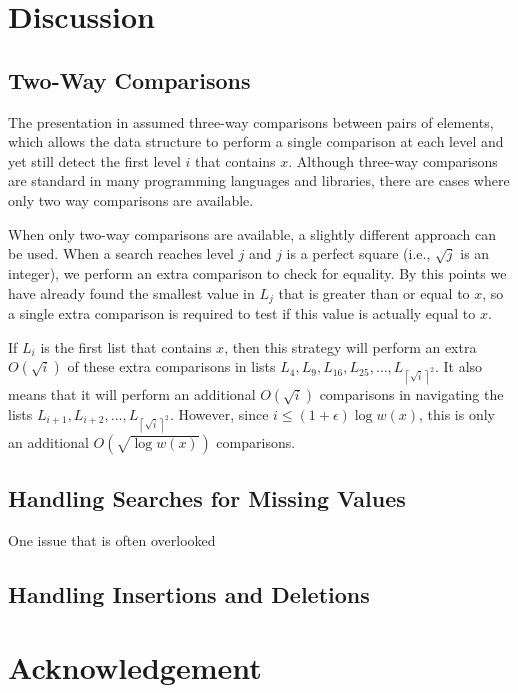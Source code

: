 \documentclass[lotsofwhite]{patmorin}
\begin{document}
\section{Discussion}

\subsection{Two-Way Comparisons}

The presentation in  assumed three-way comparisons
between pairs of elements, which allows the data structure to perform a
single comparison at each level and yet still detect the first level $i$
that contains $x$.  Although three-way comparisons are standard in many
programming languages and libraries, there are cases where only two way
comparisons are available.

When only two-way comparisons are available, a slightly different approach
can be used.  When a search reaches level $j$ and $j$ is a perfect square
(i.e., $\sqrt{j}$ is an integer), we perform an extra comparison to
check for equality.  By this points we have already found the smallest
value in $L_j$ that is greater than or equal to $x$, so a single extra
comparison is required to test if this value is actually equal to $x$.

If $L_i$ is the first list that contains $x$, then this strategy
will perform an extra $O(\sqrt{i})$ of these extra comparisons in
lists $L_4,L_9,L_{16},L_{25},\ldots,L_{\left\lceil\sqrt{i}\right\rceil^2}$.  It also
means that it will perform an additional $O(\sqrt{i})$ comparisons in
navigating the lists $L_{i+1},L_{i+2},\ldots,L_{\left\lceil\sqrt{i}\right\rceil^2}$.
However, since $i\le (1+\epsilon)\log w(x)$, this is only an additional
$O(\sqrt{\log w(x)})$ comparisons.

\subsection{Handling Searches for Missing Values}

One issue that is often overlooked

\subsection{Handling Insertions and Deletions}


\section*{Acknowledgement}
\end{document}
